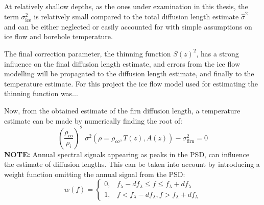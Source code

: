 \documentclass[../../CompleteThesis/Complete_1stDraft.tex]{subfiles}
\begin{document}
At relatively shallow depths, as the ones under examination in this thesis, the term $\sigma_{\text{ice}}^2$ is relatively small compared to the total diffusion length estimate $\hat{\sigma}^2$ and can be either neglected or easily accounted for with simple assumptions on ice flow and borehole temperature. 

The final correction parameter, the thinning function $S(z)^2$, has a strong influence on the final diffusion length estimate, and errors from the ice flow modelling will be propagated to the diffusion length estimate, and finally to the temperature estimate. For this project the ice flow model used for estimating the thinning function was...

Now, from the obtained estimate of the firn diffusion length, a temperature estimate can be made by numerically finding the root of:
\begin{equation}
	\left(\frac{\rho_{co}}{\rho_i}\right)^2\;\sigma^2(\rho=\rho_{co}, T(z),A(z)) - \sigma_{\text{firn}}^2 = 0
	\label{Eq:Firn_Temp_est_Roots}
\end{equation}
\textbf{NOTE:} Annual spectral signals appearing as peaks in the PSD, can influence the  estimate of diffusion lengths. This can be taken into account by introducing a weight function omitting the annual signal from the PSD:
\begin{equation}
	w(f) = \begin{cases}
		0, & f_{\lambda} - d f_{\lambda} \leq f \leq f_{\lambda} + d f_{\lambda} \\
		1, & f < f_{\lambda} - d f_{\lambda}, f > f_{\lambda} + d f_{\lambda}
	\end{cases}
\end{equation}
\end{document}
